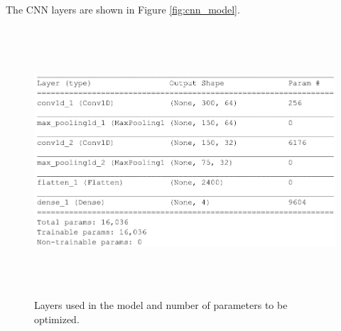 The CNN layers are shown in Figure \ref{fig:cnn_model}.

\begin{figure}[htpb]
	\centering
	\includegraphics[width=12cm,height=10cm,keepaspectratio=true]{images/model_def_var}
	\caption{
		Layers used in the model and number of parameters to be optimized.
	}
	\label{fig:model_def_var_opt}
\end{figure}



